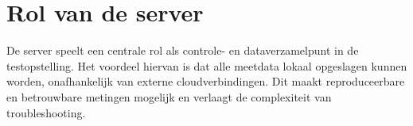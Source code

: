 \section*{Rol van de server}

De server speelt een centrale rol als controle- en dataverzamelpunt in de testopstelling. Het voordeel hiervan is dat alle meetdata lokaal opgeslagen kunnen worden, onafhankelijk van externe cloudverbindingen. Dit maakt reproduceerbare en betrouwbare metingen mogelijk en verlaagt de complexiteit van troubleshooting.


